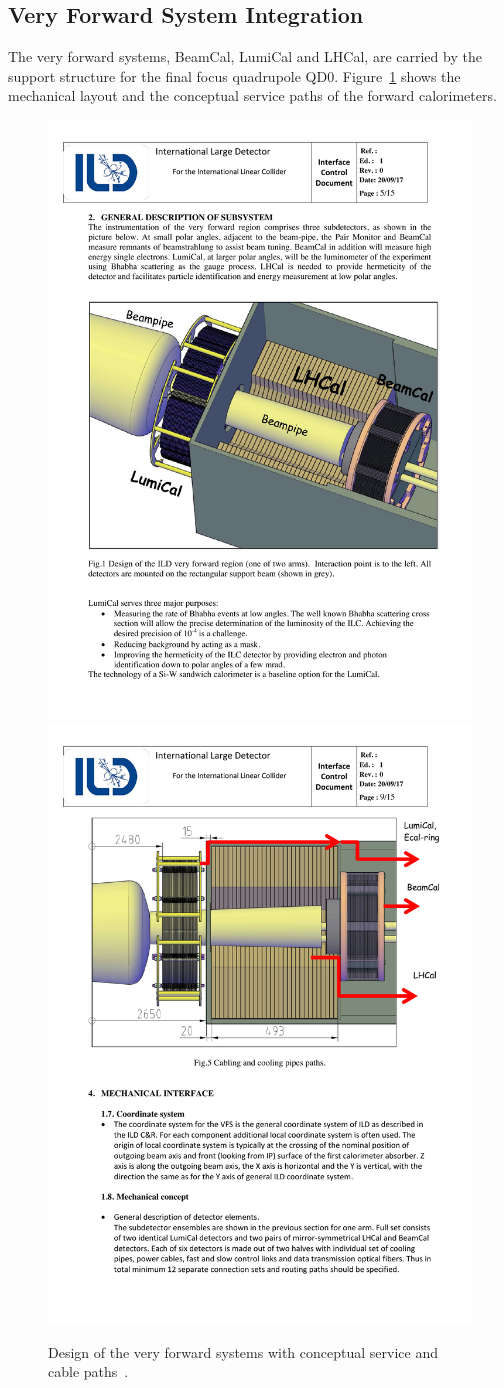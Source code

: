 
\subsection{Very Forward System Integration}
The very forward systems, BeamCal, LumiCal and LHCal, are carried by the support structure for the final focus quadrupole QD0. Figure~\ref{ILD:fig:vfs_integration} shows the mechanical layout and the conceptual service paths of the forward calorimeters.
\begin{figure}[h!]
    \centering
    \includegraphics[width=0.45\hsize]{Integration/fig/VFS_Design.pdf}
        \includegraphics[width=0.45\hsize]{Integration/fig/VFS_Services.pdf}
    \caption{Design of the very forward systems with conceptual service and cable paths~\cite{ild:bib:VFS_ICD}.}
    \label{ILD:fig:vfs_integration}
\end{figure}